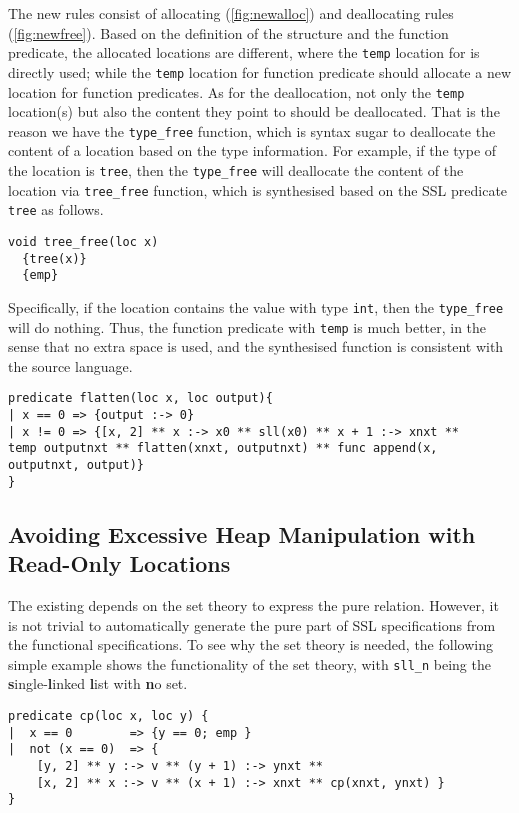 The new rules consist of allocating (\autoref{fig:newalloc}) and deallocating rules (\autoref{fig:newfree}). Based on the definition of the \func structure and the function predicate, the allocated locations are different, where the \lstinline{temp} location for \func is directly used; while the \lstinline{temp} location for function predicate should allocate a new location for function predicates. As for the deallocation, not only the \lstinline{temp} location(s) but also the content they point to should be deallocated. That is the reason we have the \lstinline{type_free} function, which is syntax sugar to deallocate the content of a location based on the type information. For example, if the type of the location is \lstinline{tree}, then the \lstinline{type_free} will deallocate the content of the location via \lstinline{tree_free} function, which is synthesised based on the SSL predicate \lstinline{tree} as follows.
\begin{lstlisting}[language=SynLang]
void tree_free(loc x)
  {tree(x)}
  {emp}
\end{lstlisting}
Specifically, if the location contains the value with type \lstinline{int}, then the \lstinline{type_free} will do nothing.
Thus, the function predicate with \lstinline{temp} is much better, in the sense that no extra space is used, and the synthesised function is consistent with the source language.

\begin{lstlisting}[language=SynLang]
predicate flatten(loc x, loc output){
| x == 0 => {output :-> 0}
| x != 0 => {[x, 2] ** x :-> x0 ** sll(x0) ** x + 1 :-> xnxt ** 
temp outputnxt ** flatten(xnxt, outputnxt) ** func append(x, outputnxt, output)}
}
\end{lstlisting}

\subsection{Avoiding Excessive Heap Manipulation with Read-Only Locations}

The existing \suslik depends on the set theory to express the pure
relation. However, it is not trivial to automatically generate the
pure part of SSL specifications from the functional specifications. To
see why the set theory is needed, the following simple example shows
the functionality of the set theory, with \lstinline{sll_n} being the
\textbf{s}ingle-\textbf{l}inked \textbf{l}ist with \textbf{n}o set.

\begin{lstlisting}[language=SynLang]
predicate cp(loc x, loc y) {
|  x == 0        => {y == 0; emp }
|  not (x == 0)  => {
    [y, 2] ** y :-> v ** (y + 1) :-> ynxt **
    [x, 2] ** x :-> v ** (x + 1) :-> xnxt ** cp(xnxt, ynxt) }
}
\end{lstlisting}

